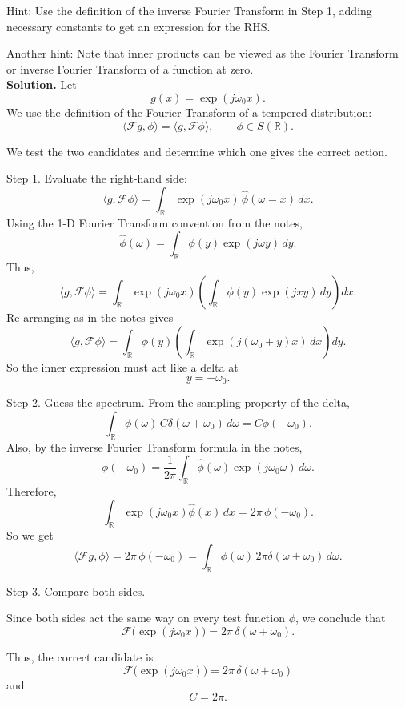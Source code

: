 \documentclass[11pt]{article}
\begin{document}
	Hint: Use the definition of the inverse Fourier Transform in Step 1, adding necessary constants to get an expression for the RHS.
	
	Another hint: Note that inner products can be viewed as the Fourier Transform or inverse Fourier Transform of a function at zero.\\
	
	\textbf{Solution.}
	Let
	\[
	g(x)=\exp(j\omega_0 x).
	\]
	We use the definition of the Fourier Transform of a tempered distribution:
	\[
	\langle \mathcal{F}g,\phi\rangle
	=
	\langle g,\mathcal{F}\phi\rangle,
	\qquad \phi\in S(\mathbb{R}).
	\]
	
	We test the two candidates and determine which one gives the correct action.
	
	Step 1. Evaluate the right-hand side:
	\[
	\langle g,\mathcal{F}\phi\rangle
	=
	\int_{\mathbb{R}} \exp(j\omega_0 x)\,\hat{\phi}(\omega=x)\,dx.
	\]
	Using the 1-D Fourier Transform convention from the notes,
	\[
	\hat{\phi}(\omega)=\int_{\mathbb{R}}\phi(y)\exp(j\omega y)\,dy.
	\]
	Thus,
	\[
	\langle g,\mathcal{F}\phi\rangle
	=
	\int_{\mathbb{R}} \exp(j\omega_0 x)
	\left(\int_{\mathbb{R}}\phi(y)\exp(jxy)\,dy\right)dx.
	\]
	Re-arranging as in the notes gives
	\[
	\langle g,\mathcal{F}\phi\rangle
	=
	\int_{\mathbb{R}} \phi(y)
	\left(\int_{\mathbb{R}} \exp(j(\omega_0+y)x)\,dx\right)dy.
	\]
	So the inner expression must act like a delta at
	\[
	y=-\omega_0.
	\]
	
	Step 2. Guess the spectrum.
	From the sampling property of the delta,
	\[
	\int_{\mathbb{R}} \phi(\omega)\,C\delta(\omega+\omega_0)\,d\omega
	=
	C\phi(-\omega_0).
	\]
	Also, by the inverse Fourier Transform formula in the notes,
	\[
	\phi(-\omega_0)
	=
	\frac{1}{2\pi}
	\int_{\mathbb{R}} \hat{\phi}(\omega)\exp(j\omega_0\omega)\,d\omega.
	\]
	Therefore,
	\[
	\int_{\mathbb{R}} \exp(j\omega_0 x)\hat{\phi}(x)\,dx
	=
	2\pi\,\phi(-\omega_0).
	\]
	So we get
	\[
	\langle \mathcal{F}g,\phi\rangle
	=
	2\pi\,\phi(-\omega_0)
	=
	\int_{\mathbb{R}} \phi(\omega)\,2\pi\delta(\omega+\omega_0)\,d\omega.
	\]
	
	Step 3. Compare both sides.
	
	Since both sides act the same way on every test function \(\phi\), we conclude that
	\[
	\mathcal{F}\big(\exp(j\omega_0 x)\big)
	=
	2\pi\,\delta(\omega+\omega_0).
	\]
	
	Thus, the correct candidate is
	\[
	\boxed{\mathcal{F}\big(\exp(j\omega_0 x)\big)=2\pi\,\delta(\omega+\omega_0)}
	\]
	and
	\[
	\boxed{C=2\pi.}
	\]
	
\end{document}
